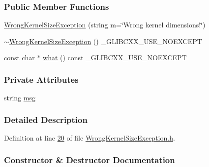 \subsubsection*{Public Member Functions}
\begin{DoxyCompactItemize}
\item 
\hyperlink{class_vision_1_1_exception_1_1_wrong_kernel_size_exception_aa508534e1d81ab9b14e8abf156660fb4}{Wrong\+Kernel\+Size\+Exception} (string m=\char`\"{}Wrong kernel dimensions!\char`\"{})
\item 
\hyperlink{class_vision_1_1_exception_1_1_wrong_kernel_size_exception_a9b7e79b2201337021162b6685365cbb9}{$\sim$\+Wrong\+Kernel\+Size\+Exception} () \+\_\+\+G\+L\+I\+B\+C\+X\+X\+\_\+\+U\+S\+E\+\_\+\+N\+O\+E\+X\+C\+E\+P\+T
\item 
const char $\ast$ \hyperlink{class_vision_1_1_exception_1_1_wrong_kernel_size_exception_a5be675f9584d0c16a98bdb97f75d3287}{what} () const \+\_\+\+G\+L\+I\+B\+C\+X\+X\+\_\+\+U\+S\+E\+\_\+\+N\+O\+E\+X\+C\+E\+P\+T
\end{DoxyCompactItemize}
\subsubsection*{Private Attributes}
\begin{DoxyCompactItemize}
\item 
string \hyperlink{class_vision_1_1_exception_1_1_wrong_kernel_size_exception_a1d5f333a2deb78a3c696ec11f6bc7224}{msg}
\end{DoxyCompactItemize}


\subsubsection{Detailed Description}


Definition at line \hyperlink{_wrong_kernel_size_exception_8h_source_l00020}{20} of file \hyperlink{_wrong_kernel_size_exception_8h_source}{Wrong\+Kernel\+Size\+Exception.\+h}.



\subsubsection{Constructor \& Destructor Documentation}
\hypertarget{class_vision_1_1_exception_1_1_wrong_kernel_size_exception_aa508534e1d81ab9b14e8abf156660fb4}{}
